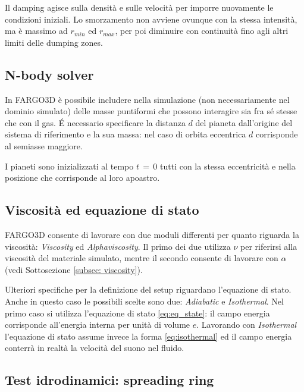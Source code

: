 Il damping agisce sulla densità e sulle velocità per imporre nuovamente le condizioni iniziali. 
Lo smorzamento non avviene ovunque con la stessa intensità, ma è massimo ad $r_{min}$ ed $r_{max}$, per poi diminuire con continuità fino agli altri limiti delle dumping zones.\\

\subsection{N-body solver}

In FARGO3D è possibile includere nella simulazione (non necessariamente nel dominio simulato) delle masse puntiformi che possono interagire sia fra sé stesse che con il gas.
\'E necessario specificare la distanza $d$ del pianeta dall'origine del sistema di riferimento e la sua massa: nel caso di orbita eccentrica $d$ corrisponde al semiasse maggiore. 

I pianeti sono inizializzati al tempo $t\,=\,0$ tutti con la stessa eccentricità e nella posizione che corrisponde al loro apoastro.

\subsection{Viscosità ed equazione di stato}

FARGO3D consente di lavorare con due moduli differenti per quanto riguarda la viscosità: \textit{Viscosity} ed \textit{Alphaviscosity}. 
Il primo dei due utilizza $\nu$ per riferirsi alla viscosità del materiale simulato, mentre il secondo consente di lavorare con $\alpha$ (vedi Sottosezione \ref{subsec: viscosity}).

Ulteriori specifiche per la definizione del setup riguardano l'equazione di stato. Anche in questo caso le possibili scelte sono due: \textit{Adiabatic} e \textit{Isothermal}.
Nel primo caso si utilizza l'equazione di stato \eqref{eq:eq_state}: il campo energia corrisponde all'energia interna per unità di volume $e$. Lavorando con \textit{Isothermal} l'equazione di stato assume invece la forma \eqref{eq:isothermal} ed il campo energia conterrà in realtà la velocità del suono nel fluido.

\subsection{Test idrodinamici: spreading ring}

